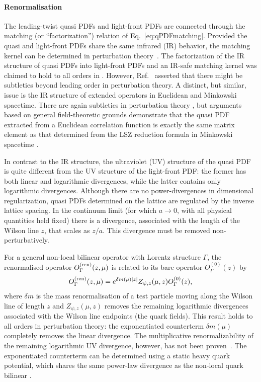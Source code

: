 \paragraph*{Renormalisation} The leading-twist quasi PDFs and light-front PDFs are connected through the matching (or ``factorization'') relation of Eq.~\eqref{eq:qPDFmatching}. Provided the quasi and light-front PDFs share the same infrared (IR) behavior, the matching kernel can be determined in perturbation theory~\cite{Xiong:2013bka}. The factorization of the IR structure of quasi PDFs into light-front PDFs and an IR-safe matching kernel was claimed to hold to all orders in \cite{Ma:2014jla, Ma:2014jga}. However, Ref.~\cite{Li:2016amo} asserted that there might be subtleties beyond leading order in perturbation theory. A distinct, but similar, issue is the IR structure of extended operators in Euclidean and Minkowski spacetime. There are again subtleties in perturbation theory \cite{Carlson:2017gpk}, but arguments based on general field-theoretic grounds demonstrate that the quasi PDF extracted from a Euclidean correlation function is exactly the same matrix element as that determined from the LSZ reduction formula in Minkowski spacetime \cite{Briceno:2017cpo}.

In contrast to the IR structure, the ultraviolet (UV) structure of the quasi PDF is quite different from the UV structure of the light-front PDF: the former has both linear and logarithmic divergences, while the latter contains only logarithmic divergences. Although there are no power-divergences in dimensional regularization, quasi PDFs determined on the lattice are regulated by the inverse lattice spacing. In the continuum limit (for which $a\to 0$, with all physical quantities held fixed) there is a divergence, associated with the length of the Wilson line $z$, that scales as $z/a$. This divergence must be removed non-perturbatively.

For a general non-local bilinear operator with Lorentz structure $\Gamma$, the renormalised operator $O_{\Gamma}^{\rm (ren)}(z,\mu)$ is
related to its bare operator $O^{(0)}_{\Gamma}(z)$ by \cite{Dotsenko:1979wb, Arefeva:1980zd, Craigie:1980qs,Dorn:1986dt}
\begin{eqnarray}\label{eq:renorm_non-local}
O_{\Gamma}^{\rm (ren)}(z,\mu)=e^{\delta m(\mu)|z|}Z_{\psi, z}(\mu,z)O^{(0)}_{\Gamma}(z),
\end{eqnarray}
where $\delta m$ is the mass renormalisation of a test particle moving along the Wilson line of length $z$ and $Z_{\psi, z}(\mu,z)$ removes the remaining logarithmic divergences associated with the Wilson line endpoints (the quark fields). This result holds to all orders in perturbation theory: the exponentiated counterterm $\delta m(\mu)$ completely removes the linear divergence. The multiplicative renormalizability of the remaining logarithmic UV divergence, however, has not been proven~\cite{Ji:2015jwa}. The exponentiated counterterm can be determined using a static heavy quark potential, which shares the same power-law divergence as the non-local quark bilinear \cite{Musch:2010ka,Ishikawa:2016znu, Chen:2016fxx}.

